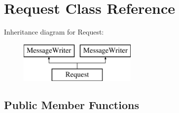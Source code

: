 \hypertarget{class_request}{}\section{Request Class Reference}
\label{class_request}
Inheritance diagram for Request\+:\begin{figure}[H]
\begin{center}
\leavevmode
\includegraphics[height=2.000000cm]{class_request}
\end{center}
\end{figure}
\subsection*{Public Member Functions}

